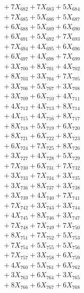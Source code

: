 \documentclass[a4paper,10pt]{article}
\begin{document}
{\begin{align}
&\;  + 7 X_{682} + 7 X_{683} + 5 X_{684} \\[0.3ex]
&\;  + 7 X_{685} + 5 X_{686} + 5 X_{687} \\[0.3ex]
&\;  + 6 X_{688} + 5 X_{689} + 6 X_{690} \\[0.3ex]
&\;  + 6 X_{691} + 5 X_{692} + 7 X_{693} \\[0.3ex]
&\;  + 7 X_{694} + 4 X_{695} + 6 X_{696} \\[0.3ex]
&\;  + 6 X_{697} + 4 X_{698} + 7 X_{699} \\[0.5ex]\allowbreak
&\;  + 3 X_{700} + 8 X_{701} + 4 X_{702} \\[0.3ex]
&\;  + 8 X_{703} + 3 X_{704} + 7 X_{705} \\[0.3ex]
&\;  + 3 X_{706} + 5 X_{707} + 3 X_{708} \\[0.3ex]
&\;  + 3 X_{709} + 6 X_{710} + 4 X_{711} \\[0.3ex]
&\;  + 4 X_{712} + 4 X_{713} + 8 X_{714} \\[0.3ex]
&\;  + 4 X_{715} + 4 X_{716} + 8 X_{717} \\[0.3ex]
&\;  + 8 X_{718} + 5 X_{719} + 6 X_{720} \\[0.3ex]
&\;  + 8 X_{721} + 6 X_{722} + 8 X_{723} \\[0.3ex]
&\;  + 6 X_{724} + 7 X_{725} + 8 X_{726} \\[0.3ex]
&\;  + 3 X_{727} + 4 X_{728} + 5 X_{729} \\[0.5ex]\allowbreak
&\;  + 7 X_{730} + 6 X_{731} + 7 X_{732} \\[0.3ex]
&\;  + 3 X_{733} + 7 X_{734} + 3 X_{735} \\[0.3ex]
&\;  + 3 X_{736} + 8 X_{737} + 3 X_{738} \\[0.3ex]
&\;  + 3 X_{739} + 4 X_{740} + 7 X_{741} \\[0.3ex]
&\;  + 7 X_{742} + 3 X_{743} + 3 X_{744} \\[0.3ex]
&\;  + 4 X_{745} + 8 X_{746} + 3 X_{747} \\[0.3ex]
&\;  + 7 X_{748} + 7 X_{749} + 7 X_{750} \\[0.3ex]
&\;  + 8 X_{751} + 7 X_{752} + 5 X_{753} \\[0.3ex]
&\;  + 7 X_{754} + 5 X_{755} + 5 X_{756} \\[0.3ex]
&\;  + 7 X_{757} + 3 X_{758} + 6 X_{759} \\[0.5ex]\allowbreak
&\;  + 4 X_{760} + 5 X_{761} + 6 X_{762} \\[0.3ex]
&\;  + 3 X_{763} + 6 X_{764} + 3 X_{765} \\[0.3ex]
&\;  + 8 X_{766} + 6 X_{767} + 6 X_{768} \\[0.3ex]

\end{align}}
\end{document}
